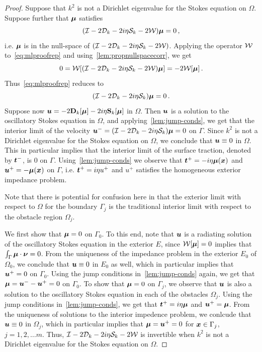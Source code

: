 \begin{proof}
  Suppose that $k^2$ is not a Dirichlet eigenvalue for the
  Stokes equation on $\Omega$. Suppose further that ${\boldsymbol \mu}$ satisfies
  \begin{equation}
    (\mathcal I - 2{\mathcal D}_{k} -2i\eta{\mathcal S}_{k} - 2{\mathcal W}) {\boldsymbol \mu} = 0 \, ,
    \label{eq:mlproofrep}
  \end{equation}
i.e. ${\boldsymbol \mu}$ is in the null-space
of $(\mathcal I - 2 {\mathcal D}_{k} - 2i\eta {\mathcal S}_{k} - 2 {\mathcal W})$. 
Applying the operator ${\mathcal W}$ to~\cref{eq:mlproofrep} and 
using~\cref{lem:propnullspacecorr}, we get
\begin{equation}
0 = {\mathcal W} [(\mathcal I - 2{\mathcal D}_{k} - 2i\eta{\mathcal S}_{k} - 2{\mathcal W}){\boldsymbol \mu}] = -2{\mathcal W} [{\boldsymbol \mu}] \, .
\end{equation}
Thus~\cref{eq:mlproofrep} reduces to
\begin{equation}
(\mathcal I - 2 {\mathcal D}_{k} - 2i\eta {\mathcal S}_{k}){\boldsymbol \mu} = 0\, .
\end{equation}
Suppose now ${\boldsymbol u} = -2{\bf D}_{k}[{\boldsymbol \mu}] -2i\eta{\bf S}_{k}[{\boldsymbol \mu}]$
in $\Omega$. Then ${\boldsymbol u}$ is a solution to the oscillatory
Stokes equation in $\Omega$, and applying~\cref{lem:jump-conds},
we get that the interior limit of the velocity
${\boldsymbol u}^{-} = (\mathcal I - 2{\mathcal D}_{k} -2i\eta{\mathcal S}_{k}) {\boldsymbol \mu} = 0$ on $\Gamma$.
Since $k^2$ is not a Dirichlet eigenvalue for the Stokes equation
on $\Omega$, we conclude that ${\boldsymbol u} \equiv 0$ in $\Omega$. 
This in particular implies that the interior limit of the
surface traction, denoted by ${\boldsymbol t}^{-}$, is $0$ on $\Gamma$.
Using~\cref{lem:jump-conds} we observe that ${\boldsymbol t}^{+}
= -i\eta {\boldsymbol \mu}({\boldsymbol x})$ and ${\boldsymbol u}^{+} = -{\boldsymbol \mu}({\boldsymbol x})$ on $\Gamma$, i.e.
${\boldsymbol t}^{+}=i\eta u^{+}$ and $u^{+}$ satisfies the homogeneous
exterior impedance problem.
\begin{remark}
  Note that there is potential for confusion here
  in that the exterior limit with respect to $\Omega$ 
  for the boundary $\Gamma_{j}$ is the traditional interior 
  limit with respect to the obstacle region $\Omega_{j}$.
\end{remark}
We first show that ${\boldsymbol \mu}=0$ on $\Gamma_{0}$. 
To this end, note that ${\boldsymbol u}$ is a radiating solution
of the oscillatory Stokes equation in the exterior $E$,
since ${\mathcal W}[{\boldsymbol \mu}] = 0$ implies that $\int_{\Gamma} {\boldsymbol \mu}
\cdot {\boldsymbol \nu} = 0$. From the uniqueness of the impedance problem
in the exterior $E_0$ of $\Omega_0$, we conclude that
${\boldsymbol u} \equiv 0$ in $E_0$ as well, which in particular
implies that ${\boldsymbol u}^{+}=0$ on $\Gamma_{0}$.   
Using the jump conditions in~\cref{lem:jump-conds}
again, we get that
${\boldsymbol \mu} = {\boldsymbol u}^{-} - {\boldsymbol u}^{+} = 0$ on
$\Gamma_{0}$. To show that ${\boldsymbol \mu}=0$ on
$\Gamma_{j}$, we observe that ${\boldsymbol u}$ is also a
solution to the oscillatory Stokes equation in each
of the obstacles $\Omega_{j}$.
Using the jump conditions in~\cref{lem:jump-conds},
we get that ${\boldsymbol t}^{+} = i\eta {\boldsymbol \mu}$ and ${\boldsymbol u}^{+} = {\boldsymbol \mu}$.
From the uniqueness of solutions to the interior 
impedence problem, we conlcude that ${\boldsymbol u} \equiv 0$
in $\Omega_{j}$, which in particular implies
that ${\boldsymbol \mu} = {\boldsymbol u}^{+} = 0$ for ${\boldsymbol x} \in \Gamma_{j}$,
$j=1,2,\ldots m$.
Thus, $\mathcal I - 2{\mathcal D}_{k} -2i\eta{\mathcal S}_{k} -2{\mathcal W}$ is
invertible when $k^2$ is not a Dirichlet eigenvalue
for the Stokes equation on $\Omega$.


\end{proof}
